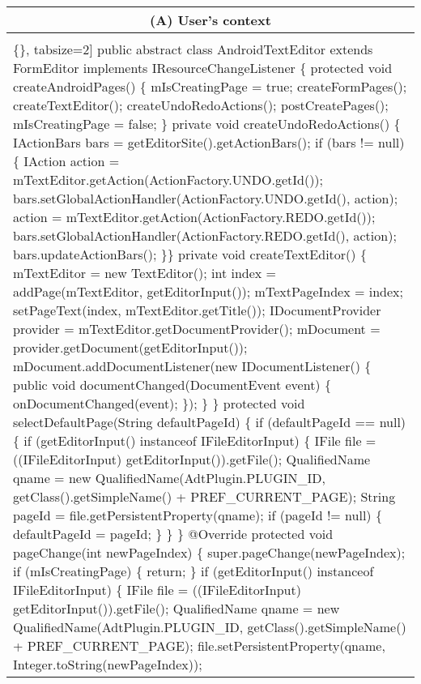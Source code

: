 



\begin{figure*}[!htb]
 \begin{minipage}{1\textwidth}
\scriptsize 
\begin{tabular}{@{}p{}} 
 \hline 
  \multicolumn{1}{c}{(A) User's context} \\ \hline
  \vspace{-4mm}
\begin{Verbatim}[commandchars=\\\{\}, tabsize=2]
public abstract class AndroidTextEditor extends FormEditor implements IResourceChangeListener \{
 protected void createAndroidPages() \{
  mIsCreatingPage = true;
  createFormPages();
  createTextEditor();
  createUndoRedoActions();
  postCreatePages();
  mIsCreatingPage = false;
 \}
 private void createUndoRedoActions() \{
  IActionBars bars = getEditorSite().getActionBars();
  if (bars != null) \{
    IAction action = mTextEditor.getAction(ActionFactory.UNDO.getId());
    bars.setGlobalActionHandler(ActionFactory.UNDO.getId(), action);
    action = mTextEditor.getAction(ActionFactory.REDO.getId());
    bars.setGlobalActionHandler(ActionFactory.REDO.getId(), action);
    bars.updateActionBars();
  \}\}
 private void createTextEditor() \{
   mTextEditor = new TextEditor();
   int index = addPage(mTextEditor, getEditorInput());
   mTextPageIndex = index;
   setPageText(index, mTextEditor.getTitle());
   IDocumentProvider provider = mTextEditor.getDocumentProvider();
   mDocument = provider.getDocument(getEditorInput());
   mDocument.addDocumentListener(new IDocumentListener() \{
    public void documentChanged(DocumentEvent event) \{
    onDocumentChanged(event);
 \}); \} \}
 protected void selectDefaultPage(String defaultPageId) \{
  if (defaultPageId == null) \{
   if (getEditorInput() instanceof IFileEditorInput) \{
    IFile file = ((IFileEditorInput) getEditorInput()).getFile();
    QualifiedName qname = new QualifiedName(AdtPlugin.PLUGIN_ID, getClass().getSimpleName() + PREF_CURRENT_PAGE);
    String pageId = file.getPersistentProperty(qname);
    if (pageId != null) \{ defaultPageId = pageId; \}
   \} \}
 @Override
 protected void pageChange(int newPageIndex) \{
  super.pageChange(newPageIndex);
  if (mIsCreatingPage) \{ return; \}
  if (getEditorInput() instanceof IFileEditorInput) \{
   IFile file = ((IFileEditorInput) getEditorInput()).getFile();
   QualifiedName qname = new QualifiedName(AdtPlugin.PLUGIN_ID, getClass().getSimpleName() + PREF_CURRENT_PAGE);
   file.setPersistentProperty(qname, Integer.toString(newPageIndex));

\end{Verbatim}
\end{tabular}
\end{minipage}
\end{figure*}
